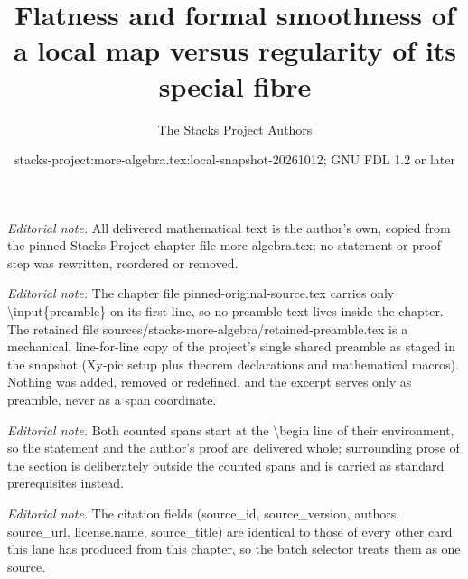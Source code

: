 \documentclass[10pt,a4paper]{amsart}
\title{Flatness and formal smoothness of a local map versus regularity of its special fibre}
\author{The Stacks Project Authors}
\date{stacks-project:more-algebra.tex:local-snapshot-20261012; GNU FDL 1.2 or later}
\theoremstyle{plain}
\theoremstyle{definition}
\theoremstyle{remark}
\numberwithin{equation}{subsection}
\begin{document}
\maketitle
\setcounter{subsection}{1}
\noindent\textit{Editorial note.} All delivered mathematical text is the author's own, copied from the pinned Stacks Project chapter file more-algebra.tex; no statement or proof step was rewritten, reordered or removed.\par\medskip
\noindent\textit{Editorial note.} The chapter file pinned-original-source.tex carries only \textbackslash{}input\{preamble\} on its first line, so no preamble text lives inside the chapter. The retained file sources/stacks-more-algebra/retained-preamble.tex is a mechanical, line-for-line copy of the project's single shared preamble as staged in the snapshot (Xy-pic setup plus theorem declarations and mathematical macros). Nothing was added, removed or redefined, and the excerpt serves only as preamble, never as a span coordinate.\par\medskip
\noindent\textit{Editorial note.} Both counted spans start at the \textbackslash{}begin line of their environment, so the statement and the author's proof are delivered whole; surrounding prose of the section is deliberately outside the counted spans and is carried as standard prerequisites instead.\par\medskip
\noindent\textit{Editorial note.} The citation fields (source\_id, source\_version, authors, source\_url, license.name, source\_title) are identical to those of every other card this lane has produced from this chapter, so the batch selector treats them as one source.\par\medskip
\end{document}
